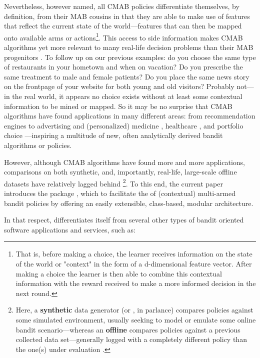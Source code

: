 \documentclass{jss}
\begin{document}
Nevertheless, however named, all CMAB policies differentiate themselves, by definition, from their MAB cousins in that they are able to make use of features that reflect the current state of the world---features that can then be mapped onto available arms or actions\footnote{That is, before making a choice, the learner receives information on the state of the world or "context" in the form of a d-dimensional feature vector. After making a choice the learner is then able to combine this contextual information with the reward received to make a more informed decision in the next round.}. This access to side information makes CMAB algorithms yet more relevant to many real-life decision problems than their MAB progenitors \citep{Langford2008}. To follow up on our previous examples: do you choose the same  type of restaurants in your hometown and when on vacation? Do you prescribe the same treatment to male and female patients? Do you place the same news story on the frontpage of your website for both young and old visitors? Probably not---in the real world, it appears no choice exists without at least some contextual information to be mined or mapped. So it may be no surprise that CMAB algorithms have found applications in many different areas: from recommendation engines \citep{Lai1985} to advertising \citep{Tang2013} and (personalized) medicine \citep{Tewari2017}, healthcare \cite{Rabbi2015}, and portfolio choice \citep{Shen2015}---inspiring a multitude of new, often analytically derived bandit algorithms or policies.

However, although CMAB algorithms have found more and more applications, comparisons on both synthetic, and, importantly, real-life, large-scale offline datasets \citep{Li2011} have relatively lagged behind \footnote{Here, a \textbf{synthetic} data generator (or , in  parlance) compares policies against some simulated environment, usually seeking to model or emulate some online bandit scenario---whereas an \textbf{offline}  compares policies against a previous collected data set---generally logged with a completely different policy than the one(s) under evaluation \citep{Li2012}.}. To this end, the current paper introduces the  package , which to facilitate the of (contextual) multi-armed bandit policies by offering an easily extensible, class-based, modular architecture.

In that respect,  differentiates itself from several other types of bandit oriented software applications and services, such as:
\end{document}
